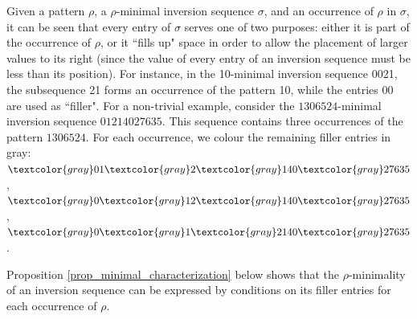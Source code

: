 \documentclass[a4paper,11pt]{article}
\theoremstyle{definition}
\theoremstyle{remark}
\newcommand{\tc}{\textcolor}
\begin{document}
Given a pattern $\rho$, a $\rho$-minimal inversion sequence $\sigma$, and an occurrence of $\rho$ in $\sigma$, it can be seen that every entry of $\sigma$ serves one of two purposes: either it is part of the occurrence of $\rho$, or it ``fills up" space in order to allow the placement of larger values to its right (since the value of every entry of an inversion sequence must be less than its position). For instance, in the 10-minimal inversion sequence 0021, the subsequence 21 forms an occurrence of the pattern 10, while the entries 00 are used as ``filler".
For a non-trivial example, consider the $1306524$-minimal inversion sequence $01214027635$. This sequence contains three occurrences of the pattern $1306524$. For each occurrence, we colour the remaining filler entries in gray: $\tc{gray}01\tc{gray}2\tc{gray}140\tc{gray}27635$, $\tc{gray}0\tc{gray}12\tc{gray}140\tc{gray}27635$, $\tc{gray}0\tc{gray}1\tc{gray}2140\tc{gray}27635$.

Proposition \ref{prop_minimal_characterization} below shows that the $\rho$-minimality of an inversion sequence can be expressed by conditions on its filler entries for each occurrence of $\rho$.
\end{document}
